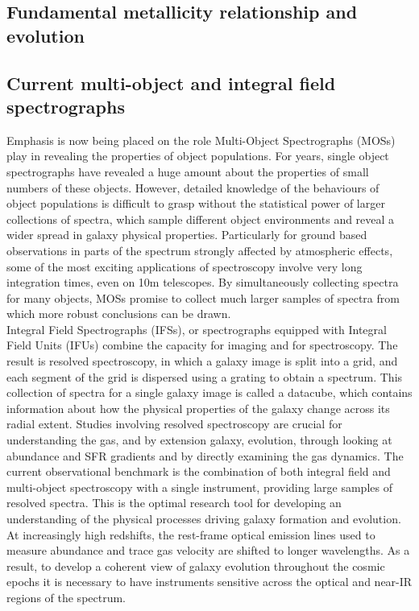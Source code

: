 \documentclass{literature}
\begin{document}
\subsection{Fundamental metallicity relationship and evolution}

\subsection{Current multi-object and integral field spectrographs}\label{subsec:current_int}
	
Emphasis is now being placed on the role Multi-Object Spectrographs (MOSs) play in revealing the properties of object populations. For years, single object spectrographs have revealed a huge amount about the properties of small numbers of these objects. However, detailed knowledge of the behaviours of object populations is difficult to grasp without the statistical power of larger collections of spectra, which sample different object environments and reveal a wider spread in galaxy physical properties. Particularly for ground based observations in parts of the spectrum strongly affected by atmospheric effects, some of the most exciting applications of spectroscopy involve very long integration times, even on 10m telescopes. By simultaneously collecting spectra for many objects, MOSs promise to collect much larger samples of spectra from which more robust conclusions can be drawn. \\

Integral Field Spectrographs (IFSs), or spectrographs equipped with Integral Field Units (IFUs) combine the capacity for imaging and for spectroscopy. The result is resolved spectroscopy, in which a galaxy image is split into a grid, and each segment of the grid is dispersed using a grating to obtain a spectrum. This collection of spectra for a single galaxy image is called a datacube, which contains information about how the physical properties of the galaxy change across its radial extent. Studies involving resolved spectroscopy are crucial for understanding the gas, and by extension galaxy, evolution, through looking at abundance and SFR gradients and by directly examining the gas dynamics. The current observational benchmark is the combination of both integral field and multi-object spectroscopy with a single instrument, providing large samples of resolved spectra. This is the optimal research tool for developing an understanding of the physical processes driving galaxy formation and evolution. At increasingly high redshifts, the rest-frame optical emission lines used to measure abundance and trace gas velocity are shifted to longer wavelengths. As a result, to develop a coherent view of galaxy evolution throughout the cosmic epochs it is necessary to have instruments sensitive across the optical and near-IR regions of the spectrum.  \\ 
\end{document}
